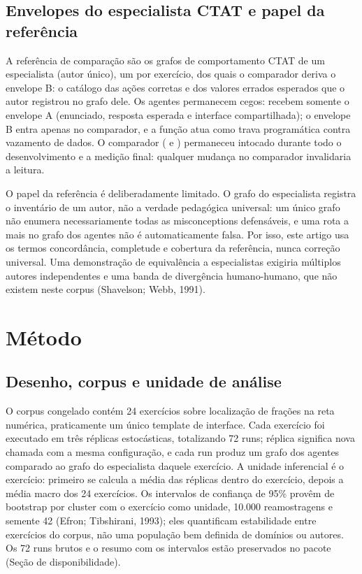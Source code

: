 \documentclass[11pt,a4paper]{article}
\begin{document}
\subsection{Envelopes do especialista CTAT e papel da referência}
\label{sec:referencia}

A referência de comparação são os grafos de comportamento CTAT de um especialista (autor único), um por exercício, dos quais o comparador deriva o envelope B: o catálogo das ações corretas e dos valores errados esperados que o autor registrou no grafo dele. Os agentes permanecem cegos: recebem somente o envelope A (enunciado, resposta esperada e interface compartilhada); o envelope B entra apenas no comparador, e a função  atua como trava programática contra vazamento de dados. O comparador ( e ) permaneceu intocado durante todo o desenvolvimento e a medição final: qualquer mudança no comparador invalidaria a leitura.

O papel da referência é deliberadamente limitado. O grafo do especialista registra o inventário de um autor, não a verdade pedagógica universal: um único grafo não enumera necessariamente todas as misconceptions defensáveis, e uma rota a mais no grafo dos agentes não é automaticamente falsa. Por isso, este artigo usa os termos concordância, completude e cobertura da referência, nunca correção universal. Uma demonstração de equivalência a especialistas exigiria múltiplos autores independentes e uma banda de divergência humano-humano, que não existem neste corpus (Shavelson; Webb, 1991).

\section{Método}
\label{sec:metodo}

\subsection{Desenho, corpus e unidade de análise}

O corpus congelado  contém 24 exercícios sobre localização de frações na reta numérica, praticamente um único template de interface. Cada exercício foi executado em três réplicas estocásticas, totalizando 72 runs; réplica significa nova chamada com a mesma configuração, e cada run produz um grafo dos agentes comparado ao grafo do especialista daquele exercício. A unidade inferencial é o exercício: primeiro se calcula a média das réplicas dentro do exercício, depois a média macro dos 24 exercícios. Os intervalos de confiança de 95\% provêm de bootstrap por cluster com o exercício como unidade, 10.000 reamostragens e semente 42 (Efron; Tibshirani, 1993); eles quantificam estabilidade entre exercícios do corpus, não uma população bem definida de domínios ou autores. Os 72 runs brutos e o resumo com os intervalos estão preservados no pacote (Seção de disponibilidade).
\end{document}

